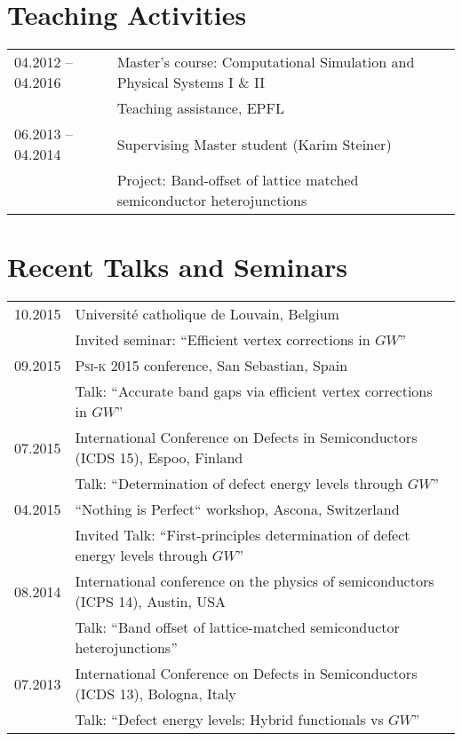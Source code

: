 \documentclass[a4paper, 11pt, DIV=15,headings=normal]{scrartcl}
\begin{document}
\section*{Teaching Activities}
\begin{tabular}{ll}
04.2012 -- 04.2016 & Master's course: Computational Simulation and Physical Systems I \& II \\
                   & Teaching assistance, EPFL\\
06.2013 -- 04.2014 & Supervising Master student (Karim Steiner) \\
                   & Project: Band-offset of lattice matched semiconductor heterojunctions 
\end{tabular}

\section*{Recent Talks and Seminars}
\begin{tabular}{ll}
10.2015         & Universit\'{e} catholique de Louvain, Belgium \\
                & Invited seminar: ``Efficient vertex corrections in $GW$'' \\
09.2015         & \textsc{Psi-k} 2015 conference, San Sebastian, Spain \\
                & Talk: ``Accurate band gaps via efficient vertex corrections in $GW$'' \\
07.2015         & International Conference on Defects in Semiconductors (ICDS 15), Espoo, Finland \\
                & Talk: ``Determination of defect energy levels through $GW$''\\
04.2015         & ``Nothing is Perfect`` workshop, Ascona, Switzerland \\
                & Invited Talk: ``First-principles determination of defect energy levels through $GW$'' \\
08.2014         & International conference on the physics of semiconductors (ICPS 14), Austin, USA \\
                & Talk: ``Band offset of lattice-matched semiconductor heterojunctions'' \\
07.2013         & International Conference on Defects in Semiconductors (ICDS 13), Bologna, Italy \\
                & Talk: ``Defect energy levels: Hybrid functionals vs $GW$'' \\
\end{tabular}
\end{document}
